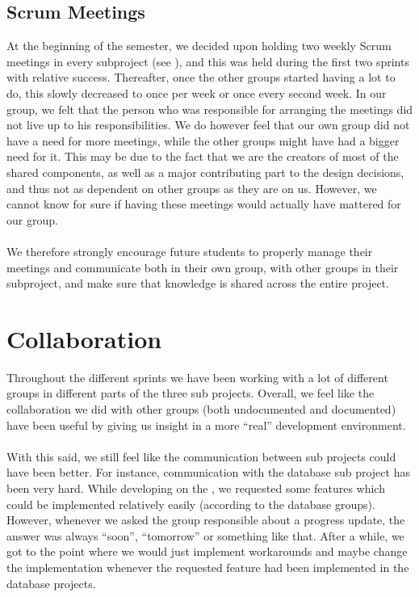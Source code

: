 \subsection{Scrum Meetings}
At the beginning of the semester, we decided upon holding two weekly Scrum meetings in every subproject (see ), and this was held during the first two sprints with relative success. Thereafter, once the other groups started having a lot to do, this slowly decreased to once per week or once every second week. In our group, we felt that the person who was responsible for arranging the meetings did not live up to his responsibilities. We do however feel that our own group did not have a need for more meetings, while the other groups might have had a bigger need for it. This may be due to the fact that we are the creators of most of the shared components, as well as a major contributing part to the design decisions, and thus not as dependent on other groups as they are on us. However, we cannot know for sure if having these meetings would actually have mattered for our group.
\\\\ 
We therefore strongly encourage future students to properly manage their meetings and communicate both in their own group, with other groups in their subproject, and make sure that knowledge is shared across the entire project.

\section{Collaboration}
Throughout the different sprints we have been working with a lot of different groups in different parts of the three sub projects. Overall, we feel like the collaboration we did with other groups (both undocumented and documented) have been useful by giving us insight in a more ``real'' development environment.
\\\\
With this said, we still feel like the communication between sub projects could have been better. For instance, communication with the database sub project has been very hard. While developing on the \ct, we requested some features which could be implemented relatively easily (according to the database groups). However, whenever we asked the group responsible about a progress update, the answer was always ``soon'', ``tomorrow'' or something like that. After a while, we got to the point where we would just implement workarounds and maybe change the implementation whenever the requested feature had been implemented in the database projects. 

